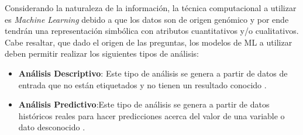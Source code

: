Considerando la naturaleza de la información, la técnica computacional a utilizar es \textit{Machine Learning} debido a que los datos son de origen genómico y por ende tendrán una representación simbólica con atributos cuantitativos y/o cualitativos. Cabe resaltar, que dado el origen de las preguntas, los modelos de ML a utilizar deben permitir realizar los siguientes tipos de análisis:

\begin{itemize}[label=\HandRight]
	\item \textbf{Análisis Descriptivo}:
	Este tipo de análisis se genera a partir de datos de entrada que no están etiquetados y no tienen un resultado conocido \cite{JorgeCalvo2020}.
	
	\item \textbf{Análisis Predictivo}:Este tipo de análisis se genera a partir de datos históricos reales para hacer predicciones acerca del valor de una variable o dato desconocido \cite{JorgeCalvo2020}.
\end{itemize}

